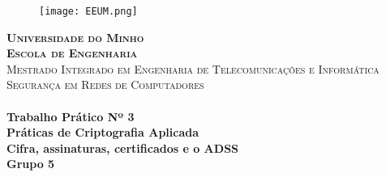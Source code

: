\documentclass[../tp3.tex]{subfiles}
\begin{document}
\begin{titlepage}

\center %
 
\begin{figure}[h]
\centering
\texttt{[image: EEUM.png]} %
\end{figure}

\textsc{\Large \textbf{Universidade do Minho}}\\
\textsc{\large \textbf{Escola de Engenharia}}\\[2cm] %
\textsc{\small Mestrado Integrado em Engenharia de Telecomunicações e Informática}\\[0.5cm] %
\textsc{\normalsize Segurança em Redes de Computadores}\\[2cm] %


\HRule \\[0.4cm]
{\huge \bfseries Trabalho Prático Nº 3}  \\ {\Large \bfseries Práticas de Criptografia Aplicada} \\ {\Large \bfseries Cifra, assinaturas, certificados e o ADSS} \\ {\large \bfseries Grupo 5}  %
\HRule \\[3.5cm]



\end{titlepage}
\end{document}
